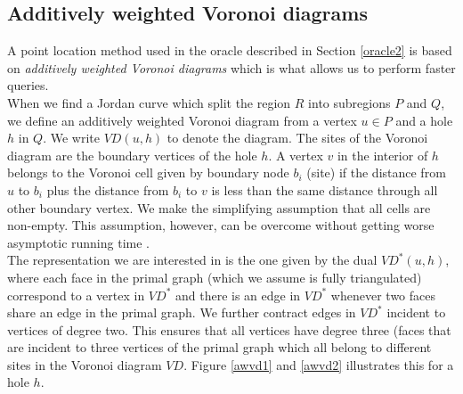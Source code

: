 \subsection{Additively weighted Voronoi diagrams}
A point location method used in the oracle described in Section \ref{oracle2} is based on
\textit{additively weighted Voronoi diagrams} which is what allows us to perform faster
queries. \\
When we find a Jordan curve which split the region $R$ into subregions $P$ and $Q$, we
define an additively weighted Voronoi diagram from a vertex $u\in P$ and a hole
$h$ in $Q$. We write $VD(u,h)$ to denote the diagram. The sites of the Voronoi diagram
are the boundary vertices of the hole $h$. A vertex $v$ in the interior of $h$ belongs to
the Voronoi cell given by boundary node $b_i$ (site) if the distance from $u$ to $b_i$
plus the distance from $b_i$ to $v$ is less
than the same distance through all other boundary vertex. We make the simplifying
assumption that all cells are non-empty. This assumption, however, can be overcome
without getting worse asymptotic running time \cite{gawrychowski2017better}.  \\
The representation we are interested in is the one given by the dual $VD^*(u,h)$, where
each face in the primal graph (which we assume is fully triangulated) correspond to a
vertex in $VD^*$ and there is an edge in $VD^*$ whenever two faces share an edge in the
primal graph. We further contract edges in $VD^*$ incident to vertices of degree two.
This ensures that all vertices have degree three (faces that are incident to three
vertices of the primal graph which all belong to different sites in the Voronoi diagram
$VD$. Figure \ref{awvd1} and \ref{awvd2} illustrates this for a hole $h$. \\
